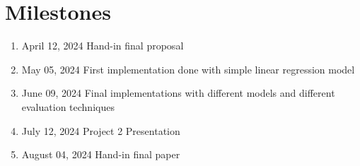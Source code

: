 \documentclass[
   fontsize=10.5pt,
   invert-title=true,
   titlepage=false,
   titleimage-ratio=13,
   class=article,
   twocolumn,
   parskip=half-
]{bfhpub}				%
\begin{document}
\section{Milestones}
\begin{enumerate}
  \item April 12, 2024 \textemdash{} Hand-in final proposal
  \item May 05, 2024 \textemdash{} First implementation done with simple
        linear regression model
  \item June 09, 2024 \textemdash{} Final implementations with different models
        and different evaluation techniques
  \item July 12, 2024 \textemdash{} Project 2 Presentation
  \item August 04, 2024 \textemdash{} Hand-in final paper
\end{enumerate}



\onecolumn
\printbibliography{}
\end{document}
